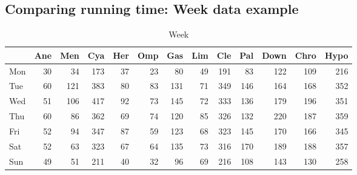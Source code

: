 \documentclass[article,nojss]{jss}\usepackage[]{graphicx}\usepackage[]{color}
\newenvironment{knitrout}{}{} %
\begin{document}
\subsection{Comparing running time: Week data example}

\begin{knitrout}
\color{fgcolor}\begin{table}[H]

\caption{\label{tab:weekdata}Week\label{tab:week}}
\centering
\begin{tabular}[t]{l|r|r|r|r|r|r|r|r|r|r|r|r}
\hline
  & Ane & Men & Cya & Her & Omp & Gas & Lim & Cle & Pal & Down & Chro & Hypo\\
\hline
Mon & 30 & 34 & 173 & 37 & 23 & 80 & 49 & 191 & 83 & 122 & 109 & 216\\
\hline
Tue & 60 & 121 & 383 & 80 & 83 & 131 & 71 & 349 & 146 & 164 & 168 & 352\\
\hline
Wed & 51 & 106 & 417 & 92 & 73 & 145 & 72 & 333 & 136 & 179 & 196 & 351\\
\hline
Thu & 60 & 86 & 362 & 69 & 74 & 120 & 85 & 326 & 132 & 220 & 187 & 359\\
\hline
Fri & 52 & 94 & 347 & 87 & 59 & 123 & 68 & 323 & 145 & 170 & 166 & 345\\
\hline
Sat & 52 & 63 & 323 & 67 & 64 & 135 & 73 & 316 & 170 & 189 & 188 & 357\\
\hline
Sun & 49 & 51 & 211 & 40 & 32 & 96 & 69 & 216 & 108 & 143 & 130 & 258\\
\hline
\end{tabular}
\end{table}

\end{knitrout}
\end{document}
